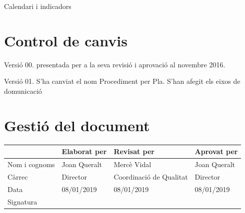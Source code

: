 \documentclass[fontsize=10pt,%
paper=a4,%
DIV=14,%
pagesize=auto,%
parskip=half,
captions=tableheading,%
numbers=noenddot,%
toc=graduated%
]{scrartcl}
\renewcommand{\arraystretch}{1.75}%
\renewcommand{\arraystretch}{1.75}%
\begin{document}
Calendari i indicadors



\section{Control de canvis}

Versió 00. presentada per a la seva revisió i aprovació al novembre 2016.

Versió 01. S'ha canviat el nom Procediment per Pla. S'han afegit els eixos de domunicació

\section{Gestió del document}\label{sec:gestiodoc}


\begin{center}\scriptsize\sffamily
\renewcommand{\arraystretch}{1.75}%
\begin{tabular}{lllp{4cm}}\hline
              & Elaborat per & Revisat per             & Aprovat per  \\ \hline
Nom i cognoms & Joan Queralt & Mercè Vidal             & Joan Queralt \\
Càrrec        & Director     & Coordinació de Qualitat & Director     \\
Data          & 08/01/2019   & 08/01/2019              & 08/01/2019   \\\hline
Signatura     &              &                         &              
\end{tabular}
\end{center}
\end{document}
